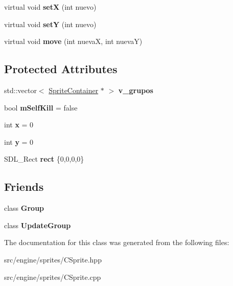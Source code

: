 \begin{DoxyCompactItemize}
\item 
virtual void {\bfseries setX} (int nuevo)\hypertarget{class_sprite_a4f16d2a3c3f8689cf336c31460c90e2f}{}\label{class_sprite_a4f16d2a3c3f8689cf336c31460c90e2f}

\item 
virtual void {\bfseries setY} (int nuevo)\hypertarget{class_sprite_a053cb5d0032b7f3dd251e56abe3a056b}{}\label{class_sprite_a053cb5d0032b7f3dd251e56abe3a056b}

\item 
virtual void {\bfseries move} (int nuevaX, int nuevaY)\hypertarget{class_sprite_aefec128e2c5336a15d46c79af7c0aa6f}{}\label{class_sprite_aefec128e2c5336a15d46c79af7c0aa6f}

\end{DoxyCompactItemize}
\subsection*{Protected Attributes}
\begin{DoxyCompactItemize}
\item 
std\+::vector$<$ \hyperlink{class_sprite_container}{Sprite\+Container} $\ast$ $>$ {\bfseries v\+\_\+grupos}\hypertarget{class_sprite_a3b3b780b1c90020ea9950183a126f6bf}{}\label{class_sprite_a3b3b780b1c90020ea9950183a126f6bf}

\item 
bool {\bfseries m\+Self\+Kill} = false\hypertarget{class_sprite_a1f4508807ef8dc680a220a34e0c4f408}{}\label{class_sprite_a1f4508807ef8dc680a220a34e0c4f408}

\item 
int {\bfseries x} = 0\hypertarget{class_sprite_ab36028dcefdd4bf024c52c8d9519a283}{}\label{class_sprite_ab36028dcefdd4bf024c52c8d9519a283}

\item 
int {\bfseries y} = 0\hypertarget{class_sprite_a363e26017ee2aaed8636f7dab92af2cd}{}\label{class_sprite_a363e26017ee2aaed8636f7dab92af2cd}

\item 
S\+D\+L\+\_\+\+Rect {\bfseries rect} \{0,0,0,0\}\hypertarget{class_sprite_ab8ae1fcc8b8fb328583438cf1f0b6e2f}{}\label{class_sprite_ab8ae1fcc8b8fb328583438cf1f0b6e2f}

\end{DoxyCompactItemize}
\subsection*{Friends}
\begin{DoxyCompactItemize}
\item 
class {\bfseries Group}\hypertarget{class_sprite_a2697825715974a353728f0d4d5658112}{}\label{class_sprite_a2697825715974a353728f0d4d5658112}

\item 
class {\bfseries Update\+Group}\hypertarget{class_sprite_a9b601c6e2934624023e7d4a1b5c53cc1}{}\label{class_sprite_a9b601c6e2934624023e7d4a1b5c53cc1}

\end{DoxyCompactItemize}


The documentation for this class was generated from the following files\+:\begin{DoxyCompactItemize}
\item 
src/engine/sprites/C\+Sprite.\+hpp\item 
src/engine/sprites/C\+Sprite.\+cpp\end{DoxyCompactItemize}

